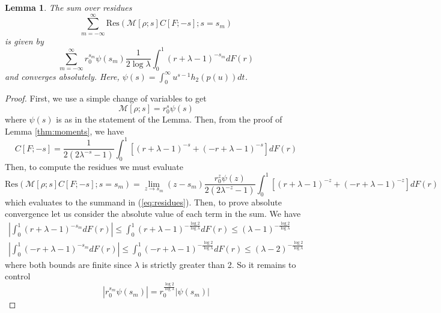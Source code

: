 \documentclass{article}
\newtheorem{lemma}{Lemma}
\begin{document}
\begin{lemma}
    The sum over residues 
    \begin{equation}
        \sum_{m=-\infty}^{\infty} \text{Res}\left(\mathcal{M}[\rho;s]C[F;-s]; s=s_m\right)
    \end{equation}
    is given by
    \begin{equation}
        \label{eq:residues}
        \sum_{m=-\infty}^{\infty} r_0^{s_m}\psi(s_m)\frac{1}{2\log\lambda}\int_0^1 (r+\lambda-1)^{-s_m}dF(r)
    \end{equation}
    and converges absolutely. Here, $\psi(s) = \int_0^{\infty} u^{s-1}h_2(p(u))dt$. 
\end{lemma}
\begin{proof}
    First, we use a simple change of variables to get
    \begin{equation}
        \mathcal{M}[\rho;s] = r_0^s\psi(s)
    \end{equation}
    where $\psi(s)$ is as in the statement of the Lemma. Then, from the proof of Lemma \ref{thm:moments}, we have
    \begin{equation}
        C[F;-s] = \frac{1}{2(2\lambda^{-s}-1)}\int_0^1\left[(r+\lambda-1)^{-s}+(-r+\lambda-1)^{-s}\right]dF(r)
    \end{equation}
    Then, to compute the residues we must evaluate
    \begin{equation}
        \text{Res}(\mathcal{M}[\rho;s]C[F;-s]; s=s_m) = \lim_{z\to s_m} (z-s_m)\frac{r_0^z\psi(z)}{2(2\lambda^{-z}-1)}\int_0^1\left[(r+\lambda-1)^{-z}+(-r+\lambda-1)^{-z}\right]dF(r)
    \end{equation}
    which evaluates to the summand in (\ref{eq:residues}). Then, to prove absolute convergence let us consider the absolute value of each term in the sum. We have
    \begin{gather}
        \left|\int_0^1(r+\lambda-1)^{-s_m}dF(r)\right| \leq \int_0^1 (r+\lambda-1)^{-\frac{\log 2}{\log \lambda}}dF(r) \leq (\lambda-1)^{-\frac{\log 2}{\log \lambda}} \nonumber \\
        \left|\int_0^1(-r+\lambda-1)^{-s_m}dF(r)\right| \leq \int_0^1(-r+\lambda-1)^{-\frac{\log 2}{\log \lambda }}dF(r) \leq (\lambda -2)^{-\frac{\log 2}{\log \lambda}}
    \end{gather}
    where both bounds are finite since $\lambda$ is strictly greater than 2. So it remains to control
    \begin{equation}
        |r_0^{s_m}\psi(s_m)| = r_0^{\frac{\log 2}{\log \lambda}}|\psi(s_m)|
    \end{equation}

\end{proof}
\end{document}
